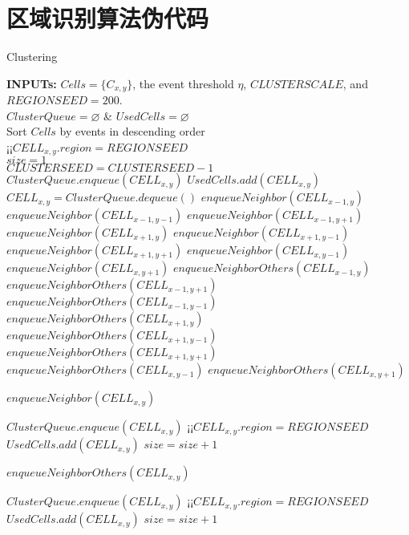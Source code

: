 \chapter{区域识别算法伪代码}
\begin{algorithm}
\caption{Clustering}\label{algorithm_connecting}
\begin{algorithmic}
\STATE \textbf{INPUTs:} $Cells=\{C_{x,y}\}$, the event threshold $\eta$, 
$CLUSTERSCALE$, and $REGIONSEED=200$.\\
\STATE $ClusterQueue=\varnothing$ \& $UsedCells=\varnothing$\\
\STATE Sort $Cells$ by events in descending order\\
\STATE¡¡$CELL_{x,y}.region=REGIONSEED$\\
\STATE  $size=1$\\
\STATE  $CLUSTERSEED=CLUSTERSEED-1$\\
\STATE $ClusterQueue.enqueue(CELL_{x,y})$
\STATE $UsedCells.add(CELL_{x,y})$
\STATE $CELL_{x,y}=ClusterQueue.dequeue()$
\STATE $enqueueNeighbor(CELL_{x-1,y})$
\STATE $enqueueNeighbor(CELL_{x-1,y-1})$
\STATE $enqueueNeighbor(CELL_{x-1,y+1})$
\STATE $enqueueNeighbor(CELL_{x+1,y})$
\STATE $enqueueNeighbor(CELL_{x+1,y-1})$
\STATE $enqueueNeighbor(CELL_{x+1,y+1})$
\STATE $enqueueNeighbor(CELL_{x,y-1})$
\STATE $enqueueNeighbor(CELL_{x,y+1})$
\ELSE
\STATE $enqueueNeighborOthers(CELL_{x-1,y})$
\STATE $enqueueNeighborOthers(CELL_{x-1,y+1})$
\STATE $enqueueNeighborOthers(CELL_{x-1,y-1})$
\STATE $enqueueNeighborOthers(CELL_{x+1,y})$
\STATE $enqueueNeighborOthers(CELL_{x+1,y-1})$
\STATE $enqueueNeighborOthers(CELL_{x+1,y+1})$
\STATE $enqueueNeighborOthers(CELL_{x,y-1})$
\STATE $enqueueNeighborOthers(CELL_{x,y+1})$
\ENDIF
\ENDWHILE
\ENDIF
\ENDFOR
\end{algorithmic}
\end{algorithm}



\begin{algorithm}
\caption{$enqueueNeighbor(CELL_{x,y})$}
\begin{algorithmic}
\STATE $ClusterQueue.enqueue(CELL_{x,y})$
\STATE¡¡$CELL_{x,y}.region=REGIONSEED$
\STATE $UsedCells.add(CELL_{x,y})$
\STATE $size=size+1$
\ENDIF
\end{algorithmic}
\end{algorithm}

\begin{algorithm}
\caption{$enqueueNeighborOthers(CELL_{x,y})$}
\begin{algorithmic}
\STATE $ClusterQueue.enqueue(CELL_{x,y})$
\STATE¡¡$CELL_{x,y}.region=REGIONSEED$\\
\STATE $UsedCells.add(CELL_{x,y})$
\STATE $size=size+1$
\ENDIF
\end{algorithmic}
\end{algorithm}
